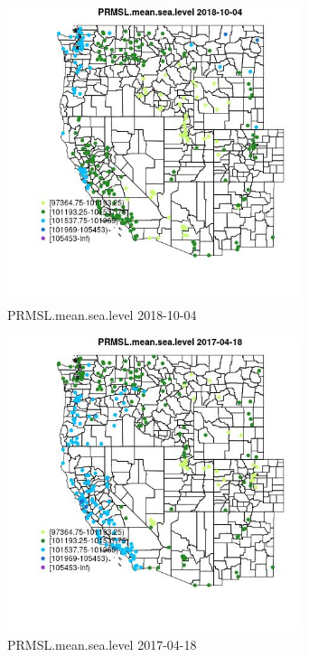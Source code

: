 \begin{figure} 
\centering  
\includegraphics[width=0.77\textwidth]{Code_Outputs/Report_ML_input_PM25_Step4_part_f_de_duplicated_aveswNAs_MapObsPRMSLmeansealevel2018-10-04.jpg} 
\caption{\label{fig:Report_ML_input_PM25_Step4_part_f_de_duplicated_aveswNAsMapObsPRMSLmeansealevel2018-10-04}PRMSL.mean.sea.level 2018-10-04} 
\end{figure} 
 

\clearpage 

\begin{figure} 
\centering  
\includegraphics[width=0.77\textwidth]{Code_Outputs/Report_ML_input_PM25_Step4_part_f_de_duplicated_aveswNAs_MapObsPRMSLmeansealevel2017-04-18.jpg} 
\caption{\label{fig:Report_ML_input_PM25_Step4_part_f_de_duplicated_aveswNAsMapObsPRMSLmeansealevel2017-04-18}PRMSL.mean.sea.level 2017-04-18} 
\end{figure} 
 

